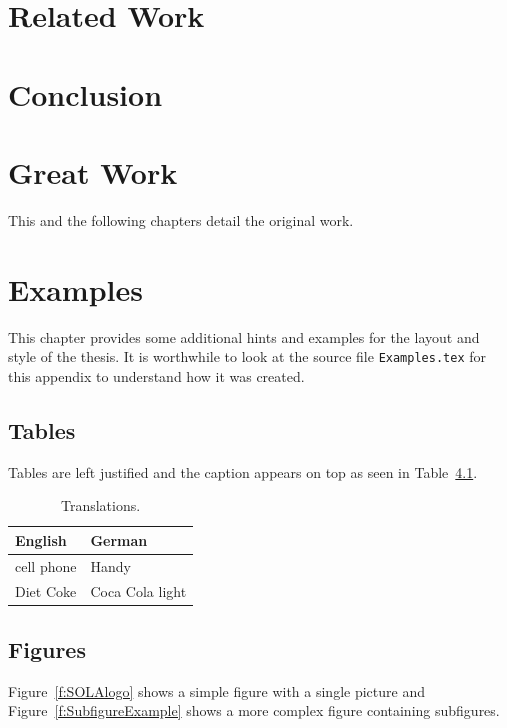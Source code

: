 \documentclass[11pt,a4paper]{book}
\begin{document}
\chapter{Related Work}
\label{s:Related Work}


\chapter{Conclusion}
\label{s:Conclusion}


\chapter{Great Work}
\label{s:GreatWork}

This and the following chapters detail the original work.

\chapter{Examples}
\label{s:Examples}

This chapter provides some additional hints and examples for the
layout and style of the thesis. It is worthwhile to look at the source
file \verb|Examples.tex| for this appendix to understand how it was
created.

\section{Tables}

Tables are left justified and the caption appears on top as seen in
Table~\ref{t:Translations}.

\begin{table}[ht]
\centering
\begin{tabular}{ll}
\hline
\textbf{English} & \textbf{German}\\
\hline
cell phone       & Handy\\
Diet Coke        & Coca Cola light\\
\hline
\end{tabular}
\caption[Translations]{\label{t:Translations}Translations.}
\end{table}

\section{Figures}

Figure~\ref{f:SOLAlogo} shows a simple figure with a single picture
and Figure~\ref{f:SubfigureExample} shows a more complex figure
containing subfigures.
\end{document}
